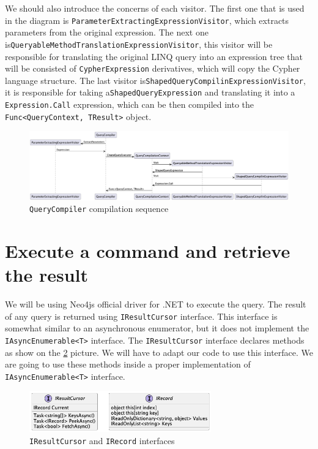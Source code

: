 We should also introduce the concerns of each visitor. The first one that is used in the diagram is \texttt{ParameterExtractingExpressionVisitor},
which extracts parameters from the original expression. The next one is\linebreak\texttt{QueryableMethodTranslationExpressionVisitor}, this visitor will
be responsible for translating the original LINQ query into an expression tree that will be consisted of \texttt{CypherExpression} derivatives,
which will copy the Cypher language structure. The last visitor is\linebreak\texttt{ShapedQueryCompilinExpressionVisitor}, it is responsible
for taking a\linebreak\texttt{ShapedQueryExpression} and translating it into a \texttt{Expression.Call} expression, which can be then compiled into
the \texttt{Func<QueryContext, TResult>} object.

\begin{figure}[H]
    \centering
    \includegraphics[width=\textheight, angle=90]{content/Translation Sequence.png}
    \caption{\texttt{QueryCompiler} compilation sequence}
    \label{fig:QueryCompilerSequence}
\end{figure}

\section{Execute a command and retrieve the result}

We will be using Neo4js official driver for .NET to execute the query. The result of any query
is returned using \texttt{IResultCursor} interface. This interface is somewhat similar to an asynchronous
enumerator, but it does not implement the \texttt{IAsyncEnumerable<T>} interface. The \texttt{IResultCursor} interface
declares methods as show on the \ref{fig:iresinterface} picture. We will have to adapt our code to use this interface.
We are going to use these methods inside a proper implementation of \texttt{IAsyncEnumerable<T>}
interface.

\begin{figure}[H]
    \centering
    \includegraphics[width=0.7\textwidth]{content/IResultCursor.png}
    \caption{\texttt{IResultCursor} and \texttt{IRecord} interfaces}
    \label{fig:iresinterface}
\end{figure}

